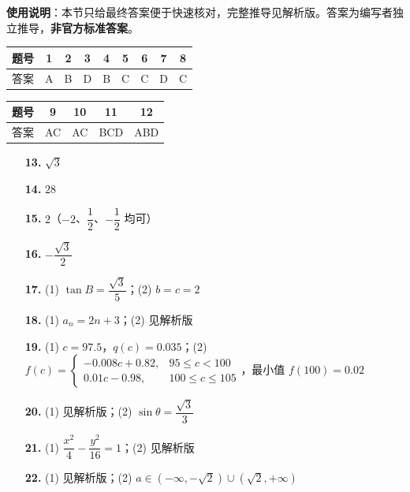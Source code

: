 
\begin{gknotice}
\textbf{使用说明}：本节只给最终答案便于快速核对，完整推导见解析版。答案为编写者独立推导，\textbf{非官方标准答案}。
\end{gknotice}

\begin{center}\begin{tabular}{ccccccccc}
\toprule
题号 & 1 & 2 & 3 & 4 & 5 & 6 & 7 & 8 \\
\midrule
答案 & A & B & D & B & C & C & D & C \\
\bottomrule
\end{tabular}\end{center}

\begin{center}\begin{tabular}{ccccc}
\toprule
题号 & 9 & 10 & 11 & 12 \\
\midrule
答案 & AC & AC & BCD & ABD \\
\bottomrule
\end{tabular}\end{center}

\begin{itemize}[leftmargin=2.6em]
  \item[\textbf{13.}] $\sqrt3$
  \item[\textbf{14.}] $28$
  \item[\textbf{15.}] $2$（$-2$、$\dfrac12$、$-\dfrac12$ 均可）
  \item[\textbf{16.}] $-\dfrac{\sqrt3}2$
\end{itemize}

\begin{itemize}[leftmargin=2.6em]
  \item[\textbf{17.}] (1) $\tan B=\dfrac{\sqrt3}5$；(2) $b=c=2$
  \item[\textbf{18.}] (1) $a_n=2n+3$；(2) 见解析版
  \item[\textbf{19.}] (1) $c=97.5$，$q(c)=0.035$；(2) $f(c)=\begin{cases}-0.008c+0.82,&95\le c<100\\ 0.01c-0.98,&100\le c\le105\end{cases}$，最小值 $f(100)=0.02$
  \item[\textbf{20.}] (1) 见解析版；(2) $\sin\theta=\dfrac{\sqrt3}3$
  \item[\textbf{21.}] (1) $\dfrac{x^{2}}4-\dfrac{y^{2}}{16}=1$；(2) 见解析版
  \item[\textbf{22.}] (1) 见解析版；(2) $a\in\left(-\infty,-\sqrt2\right)\cup\left(\sqrt2,+\infty\right)$
\end{itemize}
